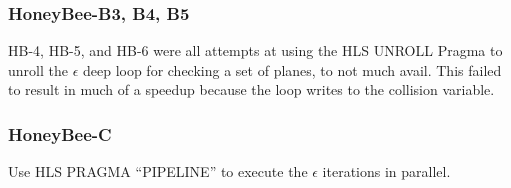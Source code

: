     \subsubsection{HoneyBee-B3, B4, B5}
    HB-4, HB-5, and HB-6 were all attempts at using the HLS UNROLL Pragma to unroll the $\epsilon$ deep loop for checking a set of planes, to not much avail. This failed to result in much of a speedup because the loop writes to the collision variable. 

    \subsubsection{HoneyBee-C}
    Use HLS PRAGMA ``PIPELINE'' to execute the $\epsilon$ iterations in parallel.
